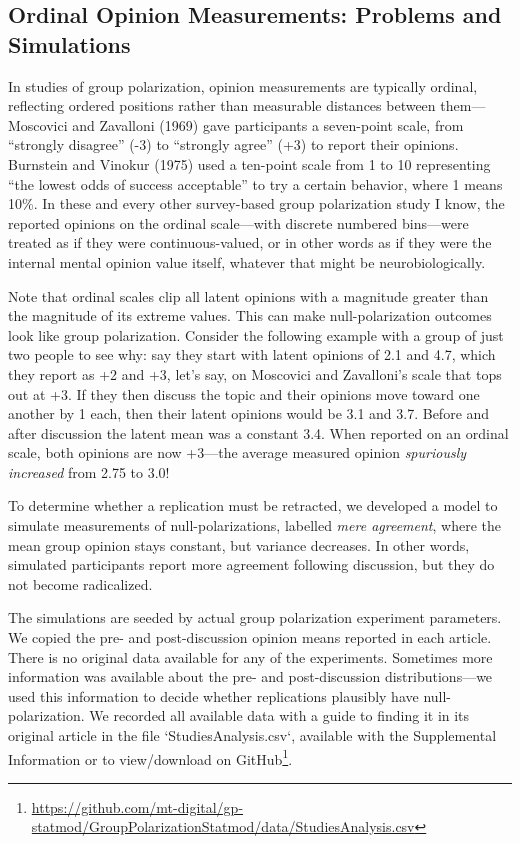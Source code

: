 \documentclass[preview]{article}
\begin{document}
\subsection{Ordinal Opinion Measurements: Problems and Simulations}

In studies of group polarization, opinion measurements are typically ordinal,
reflecting ordered positions rather than measurable distances between them—
Moscovici and Zavalloni (1969) gave participants a seven-point scale, from
“strongly disagree” (-3) to “strongly agree” (+3) to report their opinions.
Burnstein and Vinokur (1975) used a ten-point scale from 1 to 10 representing
“the lowest odds of success acceptable” to try a certain behavior, where 1
means 10\%.  In these and every other survey-based group polarization study I
know, the reported opinions on the ordinal scale—with discrete numbered
bins—were treated as if they were continuous-valued, or in other words as if
they were the internal mental opinion value itself, whatever that might be
neurobiologically. 

Note that ordinal scales clip all latent opinions with a magnitude greater
than the magnitude of its extreme values. This can make null-polarization
outcomes look like group polarization. Consider the following example 
with a group of just two people to see why: say they start with latent
opinions of 2.1 and 4.7, which they report as +2 and +3, let's say, on Moscovici
and Zavalloni's scale that tops out at +3. If they then discuss the topic and their
opinions move toward one another by 1 each, then their latent opinions would be 3.1
and 3.7. Before and after discussion the latent mean was a constant 3.4. 
When reported on an ordinal scale, both opinions are now +3—the average measured
opinion \emph{spuriously increased} from 2.75 to 3.0!

To determine whether a replication must be retracted, we developed a model to
simulate measurements of null-polarizations, labelled \emph{mere agreement}, where
the mean group opinion stays constant, but variance decreases. In other words,
simulated participants report more agreement following discussion, 
but they do not become radicalized.  

The simulations are seeded by actual group polarization experiment parameters.
We copied the pre- and post-discussion opinion means reported in each article.
There is no original data available for any of the experiments. Sometimes more
information was available about the pre- and post-discussion
distributions—we used this information to decide whether replications plausibly 
have null-polarization. We recorded all available data with a guide to finding it in
its original article in the file `StudiesAnalysis.csv`, available with the
Supplemental Information or to view/download on
GitHub\footnote{\url{https://github.com/mt-digital/gp-statmod/GroupPolarizationStatmod/data/StudiesAnalysis.csv}}.
\end{document}
